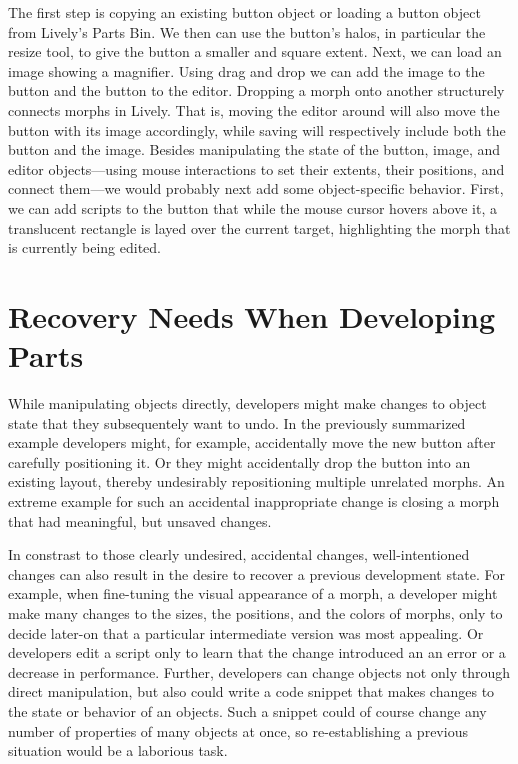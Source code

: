 The first step is copying an existing button object or loading a button object from Lively's Parts Bin.
We then can use the button's halos, in particular the resize tool, to give the button a smaller and square extent.
Next, we can load an image showing a magnifier.
Using drag and drop we can add the image to the button and the button to the editor.
Dropping a morph onto another structurely connects morphs in Lively.
That is, moving the editor around will also move the button with its image accordingly, while saving will respectively include both the button and the image.
Besides manipulating the state of the button, image, and editor objects---using mouse interactions to set their extents, their positions, and connect them---we would probably next add some object-specific behavior.
First, we can add scripts to the button that while the mouse cursor hovers above it, a translucent rectangle is layed over the current target, highlighting the morph that is currently being edited.



\section{Recovery Needs When Developing Parts}


While manipulating objects directly, developers might make changes to object state that they subsequentely want to undo.
In the previously summarized example developers might, for example, accidentally move the new button after carefully positioning it.
Or they might accidentally drop the button into an existing layout, thereby undesirably repositioning multiple unrelated morphs.
An extreme example for such an accidental inappropriate change is closing a morph that had meaningful, but unsaved changes.

In constrast to those clearly undesired, accidental changes, well-intentioned changes can also result in the desire to recover a previous development state.
For example, when fine-tuning the visual appearance of a morph, a developer might make many changes to the sizes, the positions, and the colors of morphs, only to decide later-on that a particular intermediate version was most appealing.
Or developers edit a script only to learn that the change introduced an an error or a decrease in performance.
Further, developers can change objects not only through direct manipulation, but also could write a code snippet that makes changes to the state or behavior of an objects.
Such a snippet could of course change any number of properties of many objects at once, so re-establishing a previous situation would be a laborious task.

